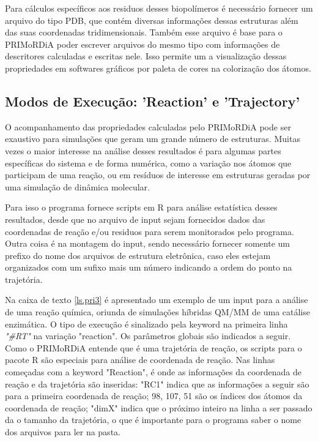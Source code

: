 \documentclass[a4paper,11pt]{refart}
\begin{document}
Para cálculos específicos aos residuos desses biopolímeros é necessário fornecer um arquivo do tipo PDB, que contém diversas informações dessas estruturas além das suas coordenadas tridimensionais. Também esse arquivo é base para o PRIMoRDiA poder escrever arquivos do mesmo tipo com informações de descritores calculadas e escritas nele. Isso permite um a visualização dessas propriedades em softwares gráficos por paleta de cores na colorização dos átomos. 


\subsection{Modos de Execução: 'Reaction' e 'Trajectory'}

O acompanhamento das propriedades calculadas pelo PRIMoRDiA pode ser exaustivo para simulações que geram um grande número de estruturas. Muitas vezes o maior interesse na análise desses resultados é para algumas partes específicas do sistema e de forma numérica, como a variação nos átomos que participam de uma reação, ou em resíduos de interesse em estruturas geradas por uma simulação de dinâmica molecular. 

Para isso o programa fornece scripts em R para análise estatística desses resultados, desde que no arquivo de input sejam fornecidos dados das coordenadas de reação e/ou residuos para serem monitorados pelo programa. Outra coisa é na montagem do input, sendo necessário fornecer somente um prefixo do nome dos arquivos de estrutura eletrônica, caso eles estejam organizados com um sufixo mais um número indicando a ordem do ponto na trajetória. 

Na caixa de texto \autoref{ls.pri3} é apresentado um exemplo de um input para a análise de uma reação química, oriunda de simulações híbridas QM/MM de uma catálise enzimática. O tipo de execução é sinalizado pela keyword na primeira linha \emph{"\#RT"} na variação "reaction". Os parâmetros globais são indicados a seguir. Como o PRIMoRDiA entende que é uma trajetória de reação, os scripts para o pacote R são especiais para análise de coordenada de reação. Nas linhas começadas com a keyword "Reaction", é onde as informações da coordenada de reação e da trajetória são inseridas: "RC1" indica que as informações a seguir são para a primeira coordenada de reação; 98, 107, 51 são os índices dos átomos da coordenada de reação; "dimX" indica que o próximo inteiro na linha a ser passado da o tamanho da trajetória, o que é importante para o programa saber o nome dos arquivos para ler na pasta. 
\end{document}
